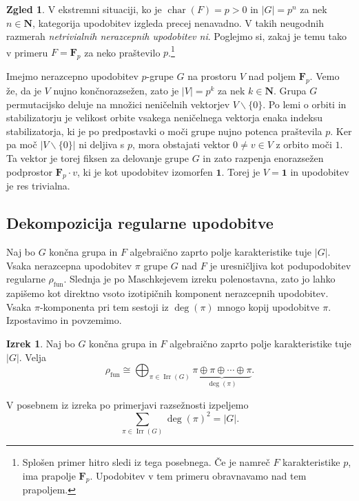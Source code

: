 \documentclass[11pt]{book}
\def\NN{\mathbf{N}}
\def\11{\mathbf{1}}
\def\FF{\mathbf{F}}
\DeclareMathOperator\Irr{Irr}
\DeclareMathOperator\characteristic{char}
\DeclareMathOperator\fun{fun}
\theoremstyle{definition}
\theoremstyle{zgled}
\newtheorem*{zgled}{Zgled}
\theoremstyle{odprtproblem}
\theoremstyle{domacanaloga}
\theoremstyle{izrek}
\newtheorem*{izrek}{Izrek}
\begin{document}
\begin{zgled}
V ekstremni situaciji, ko je $\characteristic(F) = p > 0$ in $|G| = p^n$ za nek $n \in \NN$, kategorija upodobitev izgleda precej nenavadno. V takih neugodnih razmerah \emph{netrivialnih nerazcepnih upodobitev ni}. Poglejmo si, zakaj je temu tako v primeru $F = \FF_p$ za neko praštevilo $p$.\footnote{Splošen primer hitro sledi iz tega posebnega. Če je namreč $F$ karakteristike $p$, ima prapolje $\FF_p$. Upodobitev v tem primeru obravnavamo nad tem prapoljem.}

Imejmo nerazcepno upodobitev $p$-grupe $G$ na prostoru $V$ nad poljem $\FF_p$. Vemo že, da je $V$ nujno končnorazsežen, zato je $|V| = p^k$ za nek $k \in \NN$. Grupa $G$ permutacijsko deluje na množici neničelnih vektorjev $V \backslash \{ 0 \}$. Po lemi o orbiti in stabilizatorju je velikost orbite vsakega neničelnega vektorja enaka indeksu stabilizatorja, ki je po predpostavki o moči grupe nujno potenca praštevila $p$. Ker pa moč $|V \backslash \{ 0 \}|$ ni deljiva s $p$, mora obstajati vektor $0 \neq v \in V$ z orbito moči $1$. Ta vektor je torej fiksen za delovanje grupe $G$ in zato razpenja enorazsežen podprostor $\FF_p \cdot v$, ki je kot upodobitev izomorfen $\11$. Torej je $V = \11$ in upodobitev je res trivialna.
\end{zgled}

\subsection{Dekompozicija regularne upodobitve}

Naj bo $G$ končna grupa in $F$ algebraično zaprto polje karakteristike tuje $|G|$. Vsaka nerazcepna upodobitev $\pi$ grupe $G$ nad $F$ je uresničljiva kot podupodobitev regularne $\rho_{\fun}$. Slednja je po Maschkejevem izreku polenostavna, zato jo lahko zapišemo kot direktno vsoto izotipičnih komponent nerazcepnih upodobitev. Vsaka $\pi$-komponenta pri tem sestoji iz $\deg(\pi)$ mnogo kopij upodobitve $\pi$. Izpostavimo in povzemimo.

\begin{izrek}
Naj bo $G$ končna grupa in $F$ algebraično zaprto polje karakteristike tuje $|G|$. Velja
\[
    \rho_{\fun} \cong \bigoplus_{\pi \in \Irr(G)} \underbrace{\pi \oplus \pi \oplus \cdots \oplus \pi}_{\deg(\pi)}.
\]
\end{izrek}

V posebnem iz izreka po primerjavi razsežnosti izpeljemo
\[
    \sum_{\pi \in \Irr(G)} \deg(\pi)^2 = |G|.
\]
\end{document}
